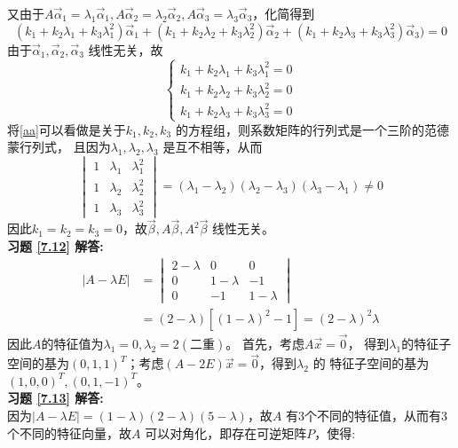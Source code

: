 又由于$A\vec{\alpha}_1=\lambda_1\vec{\alpha}_1,A\vec{\alpha}_2=\lambda_2\vec{\alpha}_2,A\vec{\alpha}_3=\lambda_3\vec{\alpha}_3$，化简得到
\begin{equation*}
  (k_1+k_2\lambda_1+k_3\lambda_1^2)\vec{\alpha}_1+
  (k_1+k_2\lambda_2+k_3\lambda_2^2)\vec{\alpha}_2+
  (k_1+k_2\lambda_3+k_3\lambda_3^2)\vec{\alpha}_3)=0
\end{equation*}
由于$\vec{\alpha}_1,\vec{\alpha}_2,\vec{\alpha}_3$ 线性无关，故
\begin{equation}\label{aa}
\begin{cases}
  k_1+k_2\lambda_1+k_3\lambda_1^2=0\\
  k_1+k_2\lambda_2+k_3\lambda_2^2=0\\
  k_1+k_2\lambda_3+k_3\lambda_3^2=0
\end{cases}
\end{equation}
将\eqref{aa}可以看做是关于$k_1,k_2,k_3$ 的方程组，则系数矩阵的行列式是一个三阶的范德蒙行列式，
且因为$\lambda_1,\lambda_2,\lambda_3$ 是互不相等，从而
\begin{equation*}
\begin{vmatrix}
  1&\lambda_1&\lambda_1^2\\
  1&\lambda_2&\lambda_2^2\\
  1&\lambda_3&\lambda_3^2
\end{vmatrix}=(\lambda_1-\lambda_2)(\lambda_2-\lambda_3)(\lambda_3-\lambda_1)\neq0
\end{equation*}
因此$k_1=k_2=k_3=0$，故$\vec{\beta},A\vec{\beta},A^2\vec{\beta}$ 线性无关。\\
\textbf{习题 \ref{7.12} 解答:}\\
\begin{align*}
  |A-\lambda E|&=\begin{vmatrix}2-\lambda&0&0\\0&1-\lambda&-1\\0&-1&1-\lambda\end{vmatrix}\\
   & =(2-\lambda)[(1-\lambda)^2-1]=(2-\lambda)^2\lambda
\end{align*}
因此$A$的特征值为$\lambda_1=0,\lambda_2=2(\text{二重})$。 首先，考虑$A\vec{x}=\vec{0}$，
得到$\lambda_1$的特征子空间的基为$(0,1,1)^T$；考虑$(A-2E)\vec{x}=\vec{0}$，得到$\lambda_2$ 的
特征子空间的基为$(1,0,0)^T,(0,1,-1)^T$。\\
\textbf{习题 \ref{7.13} 解答:}\\
因为$|A-\lambda E|=(1-\lambda)(2-\lambda)(5-\lambda)$，故$A$ 有3个不同的特征值，从而有3 个不同的特征向量，故$A$
可以对角化，即存在可逆矩阵$P$，使得:
